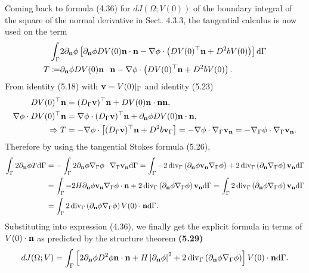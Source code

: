 \documentclass[oneside]{book}
\numberwithin{equation}{section}
\begin{document}
%
Coming back to formula (4.36) for $dJ(\Omega;V(0))$ of the boundary integral of the square of the normal derivative in Sect. 4.3.3, the tangential calculus is now used on the term
\begin{align*}
    \int_\Gamma &2\partial_{\bf n}\phi\left[\partial_{\bf n}\phi DV(0){\bf n}\cdot{\bf n} - \nabla\phi\cdot\left(DV(0)^\top{\bf n} + D^2bV(0)\right)\right]{\rm d}\Gamma\\
    T\coloneqq &\partial_{\bf n}\phi DV(0){\bf n}\cdot{\bf n} - \nabla\phi\cdot\left(DV(0)^\top{\bf n} + D^2bV(0)\right).
\end{align*}
From identity (5.18) with ${\bf v} = V(0)|_\Gamma$ and identity (5.23)
\begin{align*}
    DV(0)^\top{\bf n} &= (D_\Gamma{\bf v})^\top{\bf n} + DV(0){\bf n}\cdot{\bf n}{\bf n},\\
    \nabla\phi\cdot DV(0)^\top{\bf n} &= \nabla\phi\cdot(D_\Gamma{\bf v})^\top{\bf n} + \partial_{\bf n}\phi DV(0){\bf n}\cdot{\bf n},\\
    \Rightarrow T &= -\nabla\phi\cdot\left[(D_\Gamma{\bf v})^\top{\bf n} + D^2b{\bf v}_\Gamma\right] = -\nabla\phi\cdot\nabla_\Gamma{\bf v}_{\bf n} = -\nabla_\Gamma\phi\cdot\nabla_\Gamma{\bf v}_{\bf n}.
\end{align*}
Therefore by using the tangential Stokes formula (5.26),
\begin{align*}
    \int_\Gamma 2\partial_{\bf n}\phi T{\rm d}\Gamma &= -\int_\Gamma 2\partial_{\bf n}\phi\nabla_\Gamma\phi\cdot\nabla_\Gamma{\bf v}_{\bf n}{\rm d}\Gamma = \int_\Gamma -2\operatorname{div}_\Gamma\left(\partial_{\bf n}\phi{\bf v}_{\bf n}\nabla_\Gamma\phi\right) + 2\operatorname{div}_\Gamma\left(\partial_{\bf n}\nabla_\Gamma\phi\right){\bf v}_{\bf n}{\rm d}\Gamma\\
    &= \int_\Gamma -2H\partial_{\bf n}\phi{\bf v}_{\bf n}\nabla_\Gamma\phi\cdot{\bf n} + 2\operatorname{div}_\Gamma\left(\partial_{\bf n}\phi\nabla_\Gamma\phi\right){\bf v}_{\bf n}{\rm d}\Gamma = \int_\Gamma 2\operatorname{div}_\Gamma\left(\partial_{\bf n}\phi\nabla_\Gamma\phi\right){\bf v}_{\bf n}{\rm d}\Gamma\\
    &= \int_\Gamma 2\operatorname{div}_\Gamma\left(\partial_{\bf n}\phi\nabla_\Gamma\phi\right)V(0)\cdot{\bf n}{\rm d}\Gamma.
\end{align*}
Substituting into expression (4.36), we finally get the explicit formula in terms of $V(0)\cdot{\bf n}$ as predicted by the structure theorem \textbf{(5.29)}
\begin{align*}
    dJ(\Omega;V) = \int_\Gamma \left[2\partial_{\bf n}\phi D^2\phi{\bf n}\cdot{\bf n} + H\left|\partial_{\bf n}\phi\right|^2 + 2\operatorname{div}_\Gamma\left(\partial_{\bf n}\phi\nabla_\Gamma\phi\right)\right]V(0)\cdot{\bf n}{\rm d}\Gamma.
\end{align*}
\end{document}
